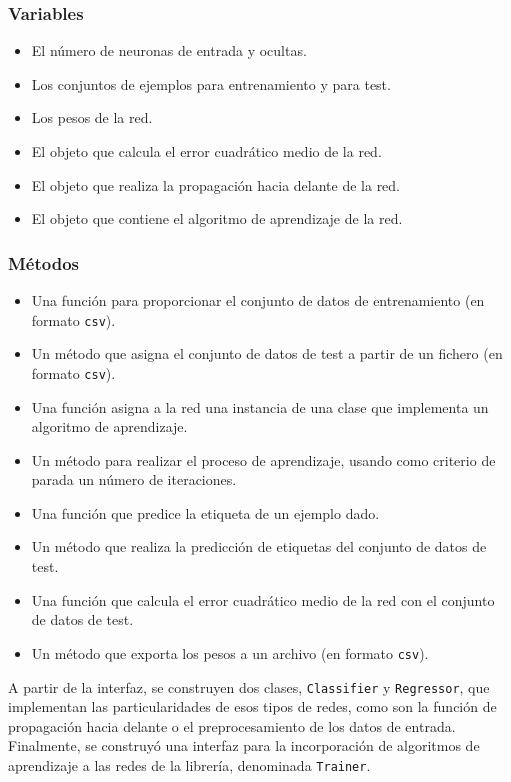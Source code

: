 \subsubsection*{Variables}
\begin{itemize}
    \item El número de neuronas de entrada y ocultas.
    \item Los conjuntos de ejemplos para entrenamiento y para test.
    \item Los pesos de la red.
    \item El objeto que calcula el error cuadrático medio de la red.
    \item El objeto que realiza la propagación hacia delante de la red.
    \item El objeto que contiene el algoritmo de aprendizaje de la red.
\end{itemize}
\subsubsection*{Métodos}
\begin{itemize}
    \item Una función para proporcionar el conjunto de datos de entrenamiento (en formato \texttt{csv}).
    \item Un método que asigna el conjunto de datos de test a partir de un fichero (en formato \texttt{csv}).
    \item Una función asigna a la red una instancia de una clase que implementa un algoritmo de aprendizaje.
    \item Un método para realizar el proceso de aprendizaje, usando como criterio de parada un número de 
    iteraciones.
    \item Una función que predice la etiqueta de un ejemplo dado.
    \item Un método que realiza la predicción de etiquetas del conjunto de datos de test.
    \item Una función que calcula el error cuadrático medio de la red con el conjunto de datos de test.
    \item Un método que exporta los pesos a un archivo (en formato \texttt{csv}).
\end{itemize}

A partir de la interfaz, se construyen dos clases, \texttt{Classifier} y \texttt{Regressor}, que implementan las
particularidades de esos tipos de redes, como son la función de propagación hacia delante o el preprocesamiento de
los datos de entrada. Finalmente, se construyó una interfaz para la incorporación de algoritmos de aprendizaje a las
redes de la librería, denominada \texttt{Trainer}.

\endinput
